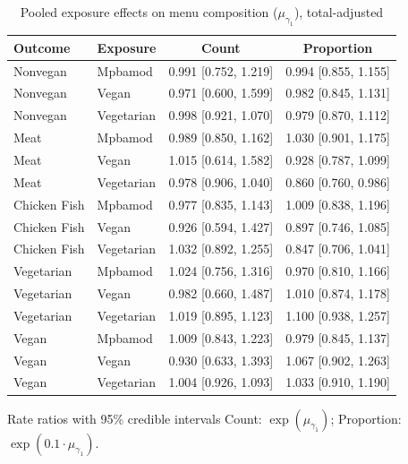 \begin{table}[H]
\centering
\caption{Pooled exposure effects on menu composition ($\mu_{\gamma_1}$), total-adjusted}
\label{tab:a1_mu_gamma_adj}
\begin{tabular}{llcc}
\toprule
Outcome & Exposure & Count & Proportion \\
\midrule
Nonvegan & Mpbamod & 0.991 [0.752, 1.219] & 0.994 [0.855, 1.155] \\
Nonvegan & Vegan & 0.971 [0.600, 1.599] & 0.982 [0.845, 1.131] \\
Nonvegan & Vegetarian & 0.998 [0.921, 1.070] & 0.979 [0.870, 1.112] \\
Meat & Mpbamod & 0.989 [0.850, 1.162] & 1.030 [0.901, 1.175] \\
Meat & Vegan & 1.015 [0.614, 1.582] & 0.928 [0.787, 1.099] \\
Meat & Vegetarian & 0.978 [0.906, 1.040] & 0.860 [0.760, 0.986] \\
Chicken Fish & Mpbamod & 0.977 [0.835, 1.143] & 1.009 [0.838, 1.196] \\
Chicken Fish & Vegan & 0.926 [0.594, 1.427] & 0.897 [0.746, 1.085] \\
Chicken Fish & Vegetarian & 1.032 [0.892, 1.255] & 0.847 [0.706, 1.041] \\
Vegetarian & Mpbamod & 1.024 [0.756, 1.316] & 0.970 [0.810, 1.166] \\
Vegetarian & Vegan & 0.982 [0.660, 1.487] & 1.010 [0.874, 1.178] \\
Vegetarian & Vegetarian & 1.019 [0.895, 1.123] & 1.100 [0.938, 1.257] \\
Vegan & Mpbamod & 1.009 [0.843, 1.223] & 0.979 [0.845, 1.137] \\
Vegan & Vegan & 0.930 [0.633, 1.393] & 1.067 [0.902, 1.263] \\
Vegan & Vegetarian & 1.004 [0.926, 1.093] & 1.033 [0.910, 1.190] \\
\bottomrule
\end{tabular}
\par\smallskip\footnotesize Rate ratios with 95\% credible intervals Count: $\exp(\mu_{\gamma_1})$; Proportion: $\exp(0.1 \cdot \mu_{\gamma_1})$.
\end{table}
